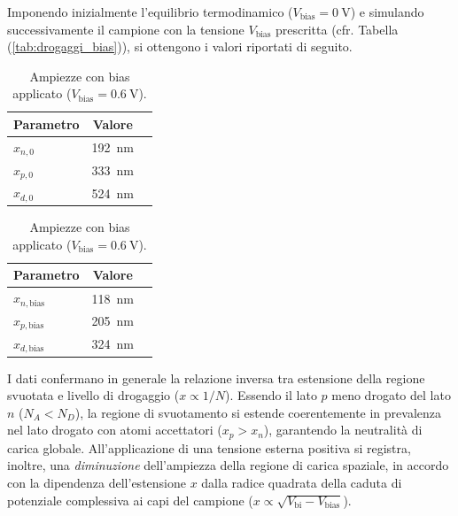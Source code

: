 \documentclass[a4paper,11pt]{report}
\begin{document}
Imponendo inizialmente l'equilibrio termodinamico ($V_{\text{bias}} = \SI{0}{\volt}$) e simulando successivamente il campione con la tensione $V_{\text{bias}}$ prescritta (cfr. Tabella (\ref{tab:drogaggi_bias})), si ottengono i valori riportati di seguito. \\
\begin{table}[h!] %
    \centering
    \begin{minipage}[t]{0.45\textwidth}
        \centering
        \caption{Ampiezze all'equilibrio termodinamico ($V_{\text{bias}} = \SI{0}{\volt}$).} %
        \label{tab:mob_n}
        \renewcommand{\arraystretch}{0.9}
       \begin{tabular}{@{}l c l@{}}
            \toprule
            \textbf{Parametro} & \textbf{Valore} \\
            \midrule
            $x_{n,0}$ & \SI{192}{\nano\meter} \\
            $x_{p,0}$ & \SI{333}{\nano\meter} \\
            $x_{d,0}$ & \SI{524}{\nano\meter} \\
            \bottomrule
        \end{tabular}
    \end{minipage}
    \hfill %
    \begin{minipage}[t]{0.45\textwidth}
        \centering
        \caption{Ampiezze con bias applicato ($V_{\text{bias}} = \SI{0.6}{\volt}$).} %
        \label{tab:mob_p}
        \renewcommand{\arraystretch}{0.9}
            \begin{tabular}{@{}l c l@{}}
            \toprule
            \textbf{Parametro} & \textbf{Valore} \\
            \midrule
            $x_{n,{\text{bias}}}$ & \SI{118}{\nano\meter} \\
            $x_{p,{\text{bias}}}$ & \SI{205}{\nano\meter} \\
            $x_{d,{\text{bias}}}$ & \SI{324}{\nano\meter} \\
            \bottomrule
        \end{tabular}
    \end{minipage}
\end{table}

\noindent
I dati confermano in generale la relazione inversa tra estensione della regione svuotata e livello di drogaggio ($x \propto 1/N$). Essendo il lato $p$ meno drogato del lato $n$ ($N_A < N_D$), la regione di svuotamento si estende coerentemente in prevalenza nel lato drogato con atomi accettatori ($x_p > x_n$), garantendo la neutralità di carica globale. All'applicazione di una tensione esterna positiva si registra, inoltre, una \textit{diminuzione} dell'ampiezza della regione di carica spaziale, in accordo con la dipendenza dell'estensione $x$ dalla radice quadrata della caduta di potenziale complessiva ai capi del campione ($x \propto \sqrt{V_{\text{bi}} - V_{\text{bias}}}$).
\end{document}
